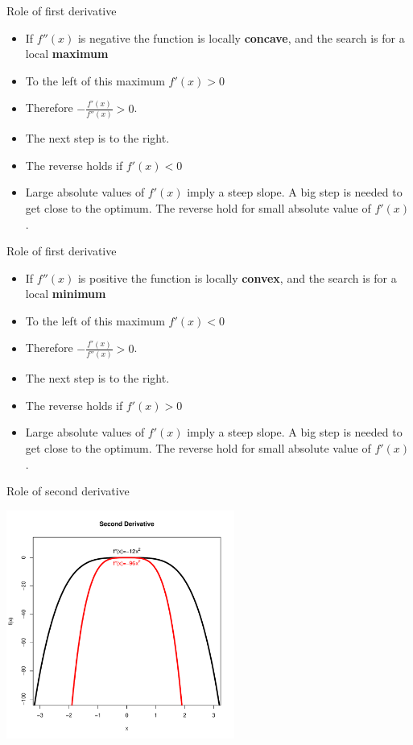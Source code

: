 \documentclass[10pt]{beamer}
\begin{document}
\begin{frame}{Role of first derivative}
  \begin{itemize}
  \item If $f''(x)$ is negative the function is locally {\bf concave}, and the search is for a local {\bf maximum}

  \item To the left of this maximum $f'(x)>0$
  \item Therefore $-\frac{f'(x)}{f''(x)}>0$.

  \item The next step is to the right.

  \item The reverse holds if $f'(x)<0$

  \item Large absolute values of $f'(x)$ imply a steep slope.  A big step is needed to get close to the optimum.  The reverse hold for small absolute value of $f'(x)$.
  \end{itemize}
\end{frame}
\begin{frame}{Role of first derivative}
  \begin{itemize}
  \item If $f''(x)$ is positive the function is locally {\bf convex}, and the search is for a local {\bf minimum}

  \item To the left of this maximum $f'(x)<0$
  \item Therefore $-\frac{f'(x)}{f''(x)}>0$.

  \item The next step is to the right.

  \item The reverse holds if $f'(x)>0$

  \item Large absolute values of $f'(x)$ imply a steep slope.  A big step is needed to get close to the optimum.  The reverse hold for small absolute value of $f'(x)$.
  \end{itemize}
\end{frame}
\begin{frame}{Role of second derivative}
  \begin{center}
    \includegraphics[height=7.5cm]{RCode/climb4.pdf}
  \end{center}
\end{frame}
\end{document}
